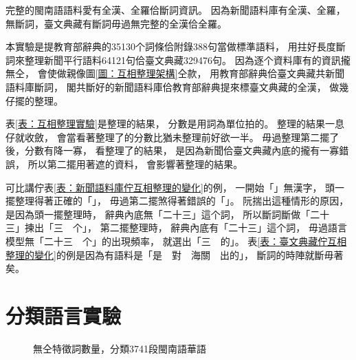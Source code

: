 完整的閩南語語料愛有全漢、全羅佮斷詞資訊。
因為新聞語料庫有全漢、全羅，無斷詞，臺文典藏有斷詞毋過無完整的全漢佮全羅。

本實驗是提教育部辭典的35130个詞條佮附錄388句當做標準語料，
用拄好長度斷詞來整理新聞平行語料64121句佮臺文典藏329476句。
因為逐个資料庫有的資訊攏無仝，
會使做親像圖\ref{圖：互相整理架構}仝款，
用教育部辭典佮臺文典藏共新聞語料庫斷詞，
閣共斷好的新聞語料庫佮教育部辭典提來標臺文典藏的全漢，
做幾仔擺的整理。


表\ref{表：互相整理實驗}是整理的結果，
分數是用詞為單位拍的。
整理的結果一息仔就收斂，
會當看著整理了的分數比猶未整理前好欲一半。
毋過整理第二擺了後，分數有降一寡，
看整理了的結果，
是因為新聞佮臺文典藏內底的攏有一寡錯誤，
所以第二擺用著遮的資料，
會影響著整理的結果。

可比講佇表\ref{表：新聞語料庫佇互相整理的變化}的例，
一開始「」無漢字，
頭一擺整理得著正確的「」，
毋過第二擺煞得著錯誤的「」。
阮揣出這種情形的原因，
是因為頭一擺整理時，
辭典內底無「二十三」這个詞，
所以斷詞斷做「二十　三」揀出「三　个」，
第二擺整理時，
辭典內底有「二十三」這个詞，
毋過語言模型無「二十三　个」的出現頻率，
就選出「三　的」。
表\ref{表：臺文典藏佇互相整理的變化}的例是因為有語料是「是　對　海關　出的」，
斷詞的時陣就斷毋著矣。


\section{分類語言實驗}
\label{節：判斷語言實驗}

\begin{figure}
\caption{無仝特徵詞數量，分類3741段閩南語華語}
\label{圖：無仝特徵詞數量對分類閩南語華語效果的影響}
\end{figure}

